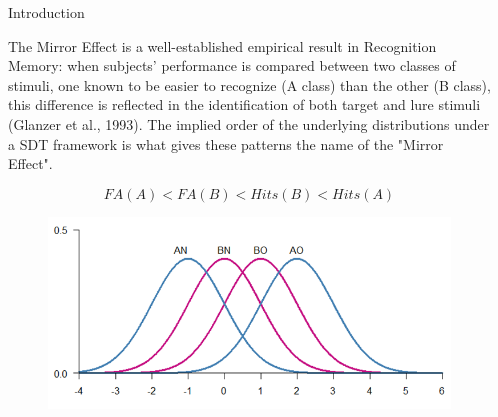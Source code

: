 \documentclass[final]{beamer}
\newlength{\sepwid}
\newlength{\onecolwid}
\begin{document}
\begin{frame}[t]

\begin{columns}[t] %
\begin{column}{\sepwid}\end{column} %
\begin{column}{\onecolwid} %

\begin{alertblock}{Introduction}

The Mirror Effect is a well-established empirical result in Recognition Memory: when  subjects' performance is compared between two classes of stimuli, one known to be easier to recognize (A class) than the other (B class), this difference is reflected in the identification of both target and lure stimuli (Glanzer et al., 1993). The  implied order of the underlying distributions under a SDT framework is what gives these patterns the name of the "Mirror Effect".

\begin{equation}
FA(A) < FA(B) < Hits(B) < Hits(A)
\label{eqn:Rates}
\end{equation}


\begin{figure}
\includegraphics[width=0.4\linewidth]{Figures/MirrorEffect.png}
\end{figure}

\end{alertblock}




\end{column}
\end{columns}
\end{frame}
\end{document}
